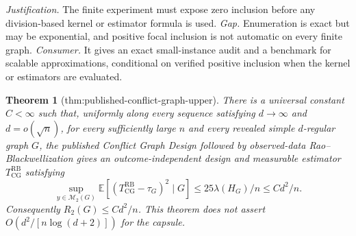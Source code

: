 \documentclass{article}
\newtheorem{theorem}{Theorem}
\begin{document}
\par\smallskip\noindent \textit{Justification.} The finite experiment must expose zero inclusion before any division-based kernel or estimator formula is used. \textit{Gap.} Enumeration is exact but may be exponential, and positive focal inclusion is not automatic on every finite graph. \textit{Consumer.} It gives an exact small-instance audit and a benchmark for scalable approximations, conditional on verified positive inclusion when the kernel or estimators are evaluated.

\begin{theorem}[thm:published-conflict-graph-upper]\label{thm:published-conflict-graph-upper}
There is a universal constant \(C<\infty\) such that, uniformly along every sequence satisfying \(d\to\infty\) and \(d=o(\sqrt n)\), for every sufficiently large \(n\) and every revealed simple \(d\)-regular graph \(G\), the published Conflict Graph Design followed by observed-data Rao--Blackwellization gives an outcome-independent design and measurable estimator \(T_{\mathrm{CG}}^{\mathrm{RB}}\) satisfying \[\sup_{y\in\mathcal M_2(G)}\mathbb E[(T_{\mathrm{CG}}^{\mathrm{RB}}-\tau_G)^2\mid G]\le 25\lambda(H_G)/n\le C d^2/n.\] Consequently \(R_2(G)\le C d^2/n\). This theorem does not assert \(O(d^2/[n\log(d+2)])\) for the capsule.
\end{theorem}
\end{document}
